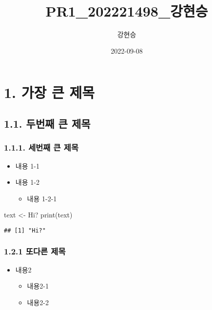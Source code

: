 \documentclass[
]{article}
\title{PR1\_202221498\_강현승}
\author{강현승}
\date{2022-09-08}
\newenvironment{Shaded}{\begin{snugshade}}{\end{snugshade}}
\newcommand{\FunctionTok}[1]{\textcolor[rgb]{0.00,0.00,0.00}{#1}}
\newcommand{\NormalTok}[1]{#1}
\newcommand{\OtherTok}[1]{\textcolor[rgb]{0.56,0.35,0.01}{#1}}
\newcommand{\StringTok}[1]{\textcolor[rgb]{0.31,0.60,0.02}{#1}}
\providecommand{\tightlist}{%
  \setlength{\itemsep}{0pt}\setlength{\parskip}{0pt}}
\begin{document}
\maketitle

\hypertarget{uxac00uxc7a5-uxd070-uxc81cuxbaa9}{%
\section{1. 가장 큰 제목}\label{uxac00uxc7a5-uxd070-uxc81cuxbaa9}}

\hypertarget{uxb450uxbc88uxc9f8-uxd070-uxc81cuxbaa9}{%
\subsection{1.1. 두번째 큰
제목}\label{uxb450uxbc88uxc9f8-uxd070-uxc81cuxbaa9}}

\hypertarget{uxc138uxbc88uxc9f8-uxd070-uxc81cuxbaa9}{%
\subsubsection{1.1.1. 세번째 큰
제목}\label{uxc138uxbc88uxc9f8-uxd070-uxc81cuxbaa9}}

\begin{itemize}
\item
  내용 1-1
\item
  내용 1-2

  \begin{itemize}
  \tightlist
  \item
    내용 1-2-1
  \end{itemize}
\end{itemize}

\begin{Shaded}
\begin{Highlighting}[]
\NormalTok{text }\OtherTok{\textless{}{-}} \StringTok{\textquotesingle{}Hi?\textquotesingle{}}
\FunctionTok{print}\NormalTok{(text)}
\end{Highlighting}
\end{Shaded}

\begin{verbatim}
## [1] "Hi?"
\end{verbatim}

\hypertarget{uxb610uxb2e4uxb978-uxc81cuxbaa9}{%
\subsubsection{1.2.1 또다른
제목}\label{uxb610uxb2e4uxb978-uxc81cuxbaa9}}

\begin{itemize}
\item
  내용2

  \begin{itemize}
  \tightlist
  \item
    내용2-1
  \item
    내용2-2
  \end{itemize}
\end{itemize}
\end{document}
